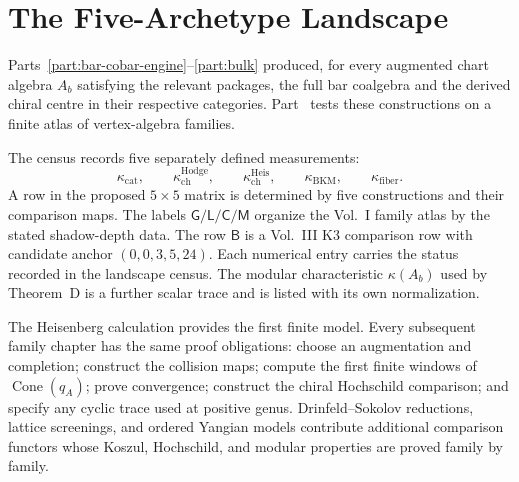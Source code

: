 \documentclass[11pt]{memoir}
\begin{document}
%
%
%

\part{The Five-Archetype Landscape}
\label{part:standard-landscape}
\label{part:physics-bridges}%
\label{part:characteristic-datum}%

\noindent
Parts~\ref{part:bar-cobar-engine}--\ref{part:bulk} produced, for every
augmented chart algebra $A_b$ satisfying the relevant packages, the
full bar coalgebra and the derived chiral centre in their respective
categories.  Part~\ref{part:standard-landscape} tests these
constructions on a finite atlas of vertex-algebra families.

The census records five separately defined measurements:
\[
 \kappa_{\mathrm{cat}},\qquad
 \kappa^{\mathrm{Hodge}}_{\mathrm{ch}},\qquad
 \kappa^{\mathrm{Heis}}_{\mathrm{ch}},\qquad
 \kappa_{\mathrm{BKM}},\qquad
 \kappa_{\mathrm{fiber}}.
\]
A row in the proposed $5{\times}5$ matrix is determined by five
constructions and their comparison maps.  The labels
$\mathsf G/\mathsf L/\mathsf C/\mathsf M$ organize the Vol.~I
family atlas by the stated shadow-depth data.  The row $\mathsf B$ is
a Vol.~III K3 comparison row with candidate anchor
$(0,0,3,5,24)$.  Each numerical entry carries the status recorded in
the landscape census.  The modular characteristic
$\kappa(A_b)$ used by Theorem~D is a further scalar trace and is
listed with its own normalization.



\noindent
The Heisenberg calculation provides the first finite model.  Every
subsequent family chapter has the same proof obligations: choose an
augmentation and completion; construct the collision maps; compute
the first finite windows of
$\operatorname{Cone}(q_A)$; prove convergence; construct the chiral
Hochschild comparison; and specify any cyclic trace used at positive
genus.  Drinfeld--Sokolov reductions, lattice screenings, and ordered
Yangian models contribute additional comparison functors whose
Koszul, Hochschild, and modular properties are proved family by
family.
\end{document}
